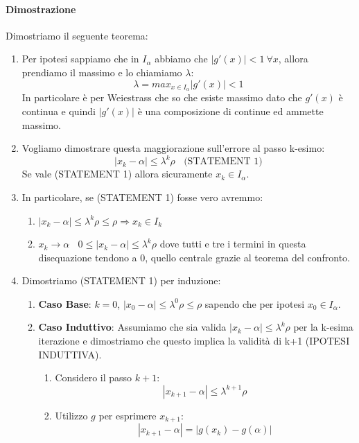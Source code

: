\documentclass{article}
\begin{document}
\paragraph{Dimostrazione} Dimostriamo il seguente teorema:

\begin{enumerate}
    \item Per ipotesi sappiamo che in $I_{\alpha}$ abbiamo che $|g'(x)| < 1 \: \forall x$, allora prendiamo il massimo e lo chiamiamo $\lambda$:
    \[ \lambda = max_{x \in I_{\alpha}} |g'(x)| < 1 \]
    In particolare è per Weiestrass che so che esiste massimo dato che $g'(x)$ è continua e quindi $|g'(x)|$ è una composizione di continue ed ammette massimo.
    
\newpage

    \item Vogliamo dimostrare questa maggiorazione sull'errore al passo k-esimo:
    \[ |x_{k} - \alpha| \leq \lambda^{k}\rho \:\:\:\: \text{(STATEMENT 1)} \]
    Se vale (STATEMENT 1) allora sicuramente $x_{k} \in I_{\alpha}$.
    \item In particolare, se (STATEMENT 1) fosse vero avremmo:
    \begin{enumerate}
        \item $|x_{k} - \alpha| \leq \lambda^{k}\rho \leq \rho \Rightarrow x_{k} \in I_{k}$
        \item $x_{k} \rightarrow \alpha \:\:\:\: 0 \leq |x_{k} - \alpha| \leq \lambda^{k}\rho$ dove tutti e tre i termini in questa disequazione tendono a 0, quello centrale grazie al teorema del confronto.
    \end{enumerate}
    \item Dimostriamo (STATEMENT 1) per induzione:
    \begin{enumerate}
        \item \textbf{Caso Base}: $k=0$, $|x_{0} - \alpha | \leq \lambda^{0}\rho \leq \rho$ sapendo che per ipotesi $x_{0} \in I_{\alpha}$.
        \item \textbf{Caso Induttivo}: Assumiamo che sia valida $|x_{k}-\alpha| \leq \lambda^{k}\rho$ per la k-esima iterazione e dimostriamo che questo implica la validità di k+1 (IPOTESI INDUTTIVA).
        \begin{enumerate}
            \item Considero il passo $k+1$:
            \[ |x_{k+1} - \alpha | \leq \lambda^{k+1}\rho  \]
            \item Utilizzo $g$ per esprimere $x_{k+1}$:
            \[ |x_{k+1} - \alpha| = |g(x_{k}) - g(\alpha) | \]

\end{enumerate}
\end{enumerate}
\end{enumerate}
\end{document}
